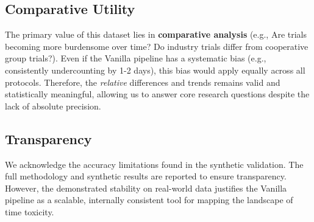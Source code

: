 \documentclass[11pt, a4paper]{article}
\begin{document}
\subsection{Comparative Utility}
The primary value of this dataset lies in \textbf{comparative analysis} (e.g., Are trials becoming more burdensome over time? Do industry trials differ from cooperative group trials?). Even if the Vanilla pipeline has a systematic bias (e.g., consistently undercounting by 1-2 days), this bias would apply equally across all protocols. Therefore, the \textit{relative} differences and trends remains valid and statistically meaningful, allowing us to answer core research questions despite the lack of absolute precision.

\subsection{Transparency}
We acknowledge the accuracy limitations found in the synthetic validation. The full methodology and synthetic results are reported to ensure transparency. However, the demonstrated stability on real-world data justifies the Vanilla pipeline as a scalable, internally consistent tool for mapping the landscape of time toxicity.
\end{document}
